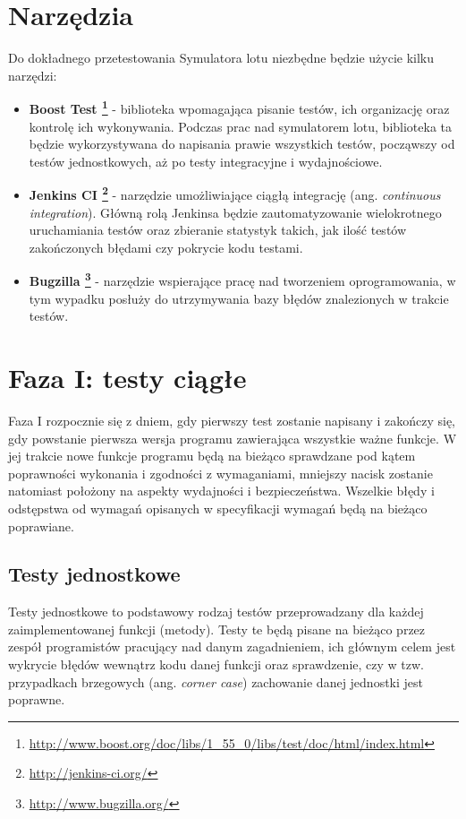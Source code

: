 \documentclass{mwrep}
\begin{document}
\chapter{Narzędzia}
Do dokładnego przetestowania Symulatora lotu niezbędne będzie użycie kilku narzędzi:
\begin{itemize}
\item \textbf{Boost Test \footnote{\url{http://www.boost.org/doc/libs/1\_55\_0/libs/test/doc/html/index.html}}} - biblioteka  wpomagająca pisanie testów, ich organizację oraz kontrolę ich wykonywania. Podczas prac nad symulatorem lotu, biblioteka ta będzie wykorzystywana do napisania prawie wszystkich testów, począwszy od testów jednostkowych, aż po testy integracyjne i wydajnościowe.
\item \textbf{Jenkins CI \footnote{\url{http://jenkins-ci.org/}}} - narzędzie umożliwiające ciągłą integrację (ang. \textit{continuous integration}). Główną rolą Jenkinsa będzie zautomatyzowanie wielokrotnego uruchamiania testów oraz zbieranie statystyk takich, jak ilość testów zakończonych błędami czy pokrycie kodu testami.
\item \textbf{Bugzilla \footnote{\url{http://www.bugzilla.org/}}} - narzędzie wspierające pracę nad tworzeniem oprogramowania, w tym wypadku posłuży do utrzymywania bazy błędów znalezionych w trakcie testów.
\end{itemize}

\chapter{Faza I: testy ciągłe}
Faza I rozpocznie się z dniem, gdy pierwszy test zostanie napisany i zakończy się, gdy powstanie pierwsza wersja programu zawierająca wszystkie ważne funkcje. W jej trakcie nowe funkcje programu będą na bieżąco sprawdzane pod kątem poprawności wykonania i zgodności z wymaganiami, mniejszy nacisk zostanie natomiast położony na aspekty wydajności i bezpieczeństwa. Wszelkie błędy i odstępstwa od wymagań opisanych w specyfikacji wymagań będą na bieżąco poprawiane.

\section{Testy jednostkowe}
Testy jednostkowe to podstawowy rodzaj testów przeprowadzany dla każdej zaimplementowanej funkcji (metody). Testy te będą pisane na bieżąco przez zespół programistów pracujący nad danym zagadnieniem, ich głównym celem jest wykrycie błędów wewnątrz kodu danej funkcji oraz sprawdzenie, czy w tzw. przypadkach brzegowych (ang. \textit{corner case}) zachowanie danej jednostki jest poprawne.
\end{document}
